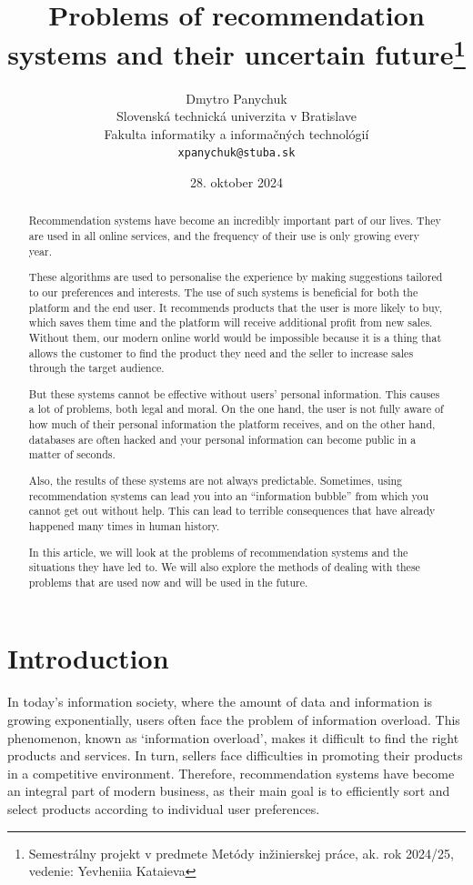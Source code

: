 \documentclass[10pt,twoside,slovak,a4paper]{article}
\title{Problems of recommendation systems and their uncertain future\thanks{Semestrálny projekt v predmete Metódy inžinierskej práce, ak. rok 2024/25, vedenie: Yevheniia Kataieva }}
\author{Dmytro Panychuk\\[2pt]
	{\small Slovenská technická univerzita v Bratislave}\\
	{\small Fakulta informatiky a informačných technológií}\\
	{\small \texttt{xpanychuk@stuba.sk}}
	}
\date{\small 28. oktober 2024}
\begin{document}
\maketitle

\begin{abstract}
\centering


Recommendation systems have become an incredibly important part of our lives. They are used in all online services, and the frequency of their use is only growing every year. 

These algorithms are used to personalise the experience by making suggestions tailored to our preferences and interests. The use of such systems is beneficial for both the platform and the end user. It recommends products that the user is more likely to buy, which saves them time and the platform will receive additional profit from new sales.  Without them, our modern online world would be impossible because it is a thing that allows the customer to find the product they need and the seller to increase sales through the target audience.

But these systems cannot be effective without users' personal information. This causes a lot of problems, both legal and moral. On the one hand, the user is not fully aware of how much of their personal information the platform receives, and on the other hand, databases are often hacked and your personal information can become public in a matter of seconds.

Also, the results of these systems are not always predictable. Sometimes, using recommendation systems can lead you into an “information bubble” from which you cannot get out without help. This can lead to terrible consequences that have already happened many times in human history. 

In this article, we will look at the problems of recommendation systems and the situations they have led to. We will also explore the methods of dealing with these problems that are used now and will be used in the future.
\newpage

\end{abstract}



\section{Introduction}
In today's information society, where the amount of data and information is growing exponentially, users often face the problem of information overload\cite{overload}. This phenomenon, known as ‘information overload’, makes it difficult to find the right products and services. In turn, sellers face difficulties in promoting their products in a competitive environment. Therefore, recommendation systems have become an integral part of modern business, as their main goal is to efficiently sort and select products according to individual user preferences.
\end{document}
